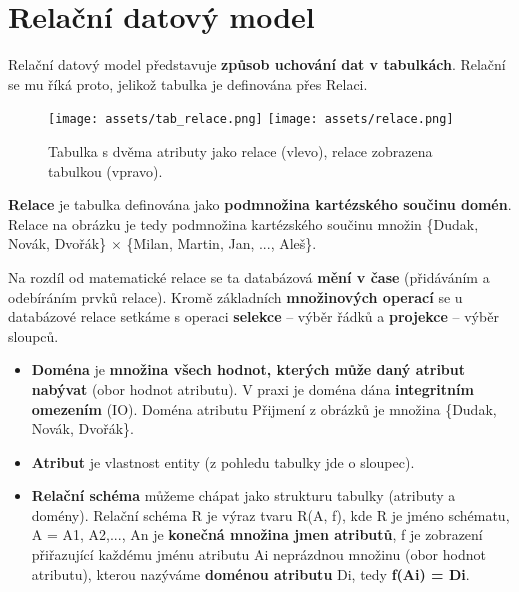 \section{Relační datový model}
Relační datový model představuje \textbf{způsob uchování dat v tabulkách}. Relační se mu říká proto, jelikož tabulka je definována přes Relaci.

\begin{figure}[H]
    \centering
    \texttt{[image: assets/tab\_relace.png]}
    \texttt{[image: assets/relace.png]}
    \caption{Tabulka s dvěma atributy jako relace (vlevo), relace zobrazena tabulkou (vpravo).}
\end{figure}

\textbf{Relace} je tabulka definována jako \textbf{podmnožina kartézského součinu domén}. Relace na obrázku je tedy podmnožina kartézského součinu množin \{Dudak, Novák, Dvořák\} $\times$ \{Milan, Martin, Jan, ..., Aleš\}.

Na rozdíl od matematické relace se ta databázová \textbf{mění v čase} (přidáváním a odebíráním prvků relace). Kromě základních \textbf{množinových operací} se u databázové relace setkáme s operaci \textbf{selekce} -- výběr řádků a \textbf{projekce} -- výběr sloupců.

\begin{itemize}
    \item \textbf{Doména} je \textbf{množina všech hodnot, kterých může daný atribut nabývat} (obor hodnot atributu). V praxi je doména dána\textbf{ integritním omezením} (IO). Doména atributu Přijmení z obrázků je množina \{Dudak, Novák, Dvořák\}.
    \item \textbf{Atribut} je vlastnost entity (z pohledu tabulky jde o sloupec).
    \item \textbf{Relační schéma} můžeme chápat jako strukturu tabulky (atributy a domény).
          Relační schéma R je výraz tvaru R(A, f),  kde  R  je jméno schématu, A = {A1, A2,..., An} je \textbf{konečná množina jmen atributů}, f je zobrazení přiřazující každému jménu atributu Ai neprázdnou množinu (obor hodnot atributu), kterou nazýváme \textbf{doménou atributu} Di, tedy \textbf{f(Ai) = Di}.
\end{itemize}

